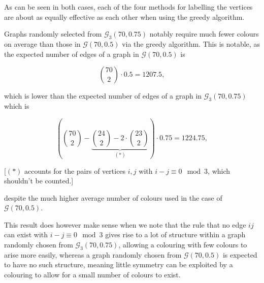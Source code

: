 \documentclass{article}
\begin{document}
As can be seen in both cases, each of the four methods for labelling the vertices are about as equally effective as each other when using the greedy algorithm. %

Graphs randomly selected from $\mathcal{G}_3(70,0.75)$ notably require much fewer colours on average than those in $\mathcal{G}(70,0.5)$ via the greedy algorithm. This is notable, as the expected number of edges of a graph in $\mathcal{G}(70,0.5)$ is

$$\binom{70}{2} \cdot 0.5 = 1207.5,$$

which is lower than the expected number of edges of a graph in $\mathcal{G}_3(70,0.75)$ which is

$$\left(\binom{70}{2} - \underbrace{\binom{24}{2} - 2 \cdot \binom{23}{2}}_{(\ast)}\right) \cdot 0.75 = 1224.75,$$

[$(\ast)$ accounts for the pairs of vertices $i,j$ with $i-j \equiv 0 \mod 3$, which shouldn't be counted.]

despite the much higher average number of colours used in the case of $\mathcal{G}(70,0.5)$.

This result does however make sense when we note that the rule that no edge $ij$ can exist with $i-j \equiv 0 \mod 3$ gives rise to a lot of structure within a graph randomly chosen from $\mathcal{G}_3(70,0.75)$, allowing a colouring with few colours to arise more easily, whereas a graph randomly chosen from $\mathcal{G}(70,0.5)$ is expected to have no such structure, meaning little symmetry can be exploited by a colouring to allow for a small number of colours to exist.



\end{document}
